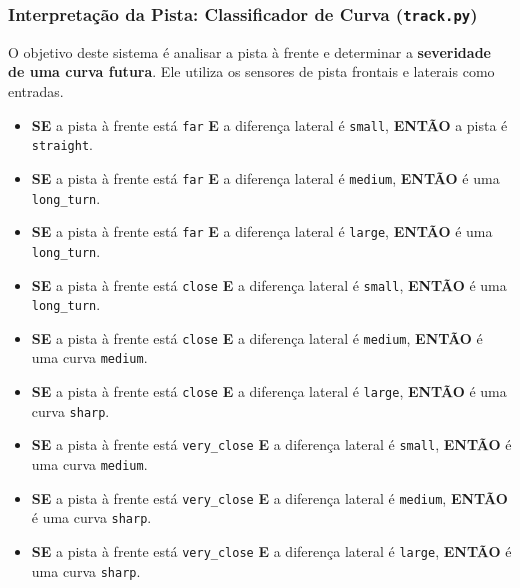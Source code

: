 \documentclass[12pt]{article}
\begin{document}
\subsubsection{Interpretação da Pista: Classificador de Curva (\texttt{track.py})}
O objetivo deste sistema é analisar a pista à frente e determinar a \textbf{severidade de uma curva futura}. Ele utiliza os sensores de pista frontais e laterais como entradas.
\begin{itemize}[label=\textbullet, leftmargin=*]
    \item \textbf{SE} a pista à frente está \texttt{far} \textbf{E} a diferença lateral é \texttt{small}, \textbf{ENTÃO} a pista é \texttt{straight}.
    \item \textbf{SE} a pista à frente está \texttt{far} \textbf{E} a diferença lateral é \texttt{medium}, \textbf{ENTÃO} é uma \texttt{long\_turn}.
    \item \textbf{SE} a pista à frente está \texttt{far} \textbf{E} a diferença lateral é \texttt{large}, \textbf{ENTÃO} é uma \texttt{long\_turn}.
    \item \textbf{SE} a pista à frente está \texttt{close} \textbf{E} a diferença lateral é \texttt{small}, \textbf{ENTÃO} é uma \texttt{long\_turn}.
    \item \textbf{SE} a pista à frente está \texttt{close} \textbf{E} a diferença lateral é \texttt{medium}, \textbf{ENTÃO} é uma curva \texttt{medium}.
    \item \textbf{SE} a pista à frente está \texttt{close} \textbf{E} a diferença lateral é \texttt{large}, \textbf{ENTÃO} é uma curva \texttt{sharp}.
    \item \textbf{SE} a pista à frente está \texttt{very\_close} \textbf{E} a diferença lateral é \texttt{small}, \textbf{ENTÃO} é uma curva \texttt{medium}.
    \item \textbf{SE} a pista à frente está \texttt{very\_close} \textbf{E} a diferença lateral é \texttt{medium}, \textbf{ENTÃO} é uma curva \texttt{sharp}.
    \item \textbf{SE} a pista à frente está \texttt{very\_close} \textbf{E} a diferença lateral é \texttt{large}, \textbf{ENTÃO} é uma curva \texttt{sharp}.
\end{itemize}
\end{document}
